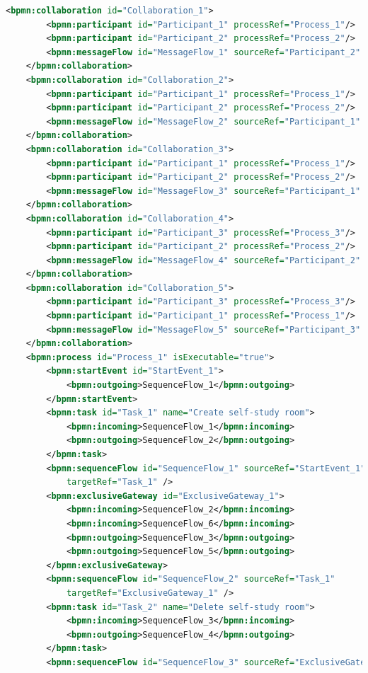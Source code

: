 \documentclass[runningheads]{llncs}
\begin{document}
	\noindent 
    \begin{lstlisting}[language={XML}]
        <bpmn:collaboration id="Collaboration_1">
		<bpmn:participant id="Participant_1" processRef="Process_1"/>
		<bpmn:participant id="Participant_2" processRef="Process_2"/>
		<bpmn:messageFlow id="MessageFlow_1" sourceRef="Participant_2" targetRef="Participant_1"/>
	</bpmn:collaboration>
	<bpmn:collaboration id="Collaboration_2">
		<bpmn:participant id="Participant_1" processRef="Process_1"/>
		<bpmn:participant id="Participant_2" processRef="Process_2"/>
		<bpmn:messageFlow id="MessageFlow_2" sourceRef="Participant_1" targetRef="Participant_2"/>
	</bpmn:collaboration>
	<bpmn:collaboration id="Collaboration_3">
		<bpmn:participant id="Participant_1" processRef="Process_1"/>
		<bpmn:participant id="Participant_2" processRef="Process_2"/>
		<bpmn:messageFlow id="MessageFlow_3" sourceRef="Participant_1" targetRef="Participant_2"/>
	</bpmn:collaboration>
	<bpmn:collaboration id="Collaboration_4">
		<bpmn:participant id="Participant_3" processRef="Process_3"/>
		<bpmn:participant id="Participant_2" processRef="Process_2"/>
		<bpmn:messageFlow id="MessageFlow_4" sourceRef="Participant_2" targetRef="Participant_3"/>
	</bpmn:collaboration>
	<bpmn:collaboration id="Collaboration_5">
		<bpmn:participant id="Participant_3" processRef="Process_3"/>
		<bpmn:participant id="Participant_1" processRef="Process_1"/>
		<bpmn:messageFlow id="MessageFlow_5" sourceRef="Participant_3" targetRef="Participant_1"/>
	</bpmn:collaboration>
	<bpmn:process id="Process_1" isExecutable="true">
		<bpmn:startEvent id="StartEvent_1">
	        <bpmn:outgoing>SequenceFlow_1</bpmn:outgoing>
	    </bpmn:startEvent>
		<bpmn:task id="Task_1" name="Create self-study room">
	        <bpmn:incoming>SequenceFlow_1</bpmn:incoming>
	        <bpmn:outgoing>SequenceFlow_2</bpmn:outgoing>
	    </bpmn:task>
		<bpmn:sequenceFlow id="SequenceFlow_1" sourceRef="StartEvent_1"
	        targetRef="Task_1" />
		<bpmn:exclusiveGateway id="ExclusiveGateway_1">
			<bpmn:incoming>SequenceFlow_2</bpmn:incoming>
			<bpmn:incoming>SequenceFlow_6</bpmn:incoming>
	        <bpmn:outgoing>SequenceFlow_3</bpmn:outgoing>
			<bpmn:outgoing>SequenceFlow_5</bpmn:outgoing>
		</bpmn:exclusiveGateway>
		<bpmn:sequenceFlow id="SequenceFlow_2" sourceRef="Task_1"
	        targetRef="ExclusiveGateway_1" />
		<bpmn:task id="Task_2" name="Delete self-study room">
	        <bpmn:incoming>SequenceFlow_3</bpmn:incoming>
	        <bpmn:outgoing>SequenceFlow_4</bpmn:outgoing>
	    </bpmn:task>
		<bpmn:sequenceFlow id="SequenceFlow_3" sourceRef="ExclusiveGateway_1"

\end{lstlisting}
\end{document}
